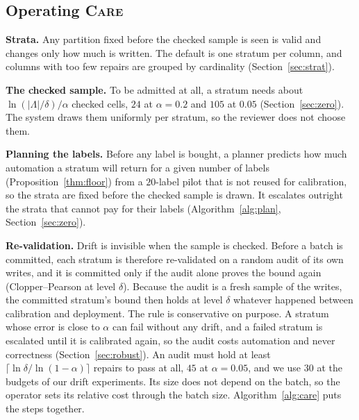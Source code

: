 \documentclass[sigconf, nonacm, balance=false]{acmart}
\theoremstyle{remark}
\begin{document}
\subsection{Operating \textsc{Care}}
\label{sec:operate}
\textbf{Strata.} Any partition fixed before the checked sample is seen is valid and
changes only how much is written. The default is one stratum per column, and columns
with too few repairs are grouped by cardinality (Section~\ref{sec:strat}).

\textbf{The checked sample.} To be admitted at all, a stratum needs about
$\ln(|\Lambda|/\delta)/\alpha$ checked cells, $24$ at $\alpha=0.2$ and $105$ at $0.05$
(Section~\ref{sec:zero}). The system draws them uniformly per stratum, so the reviewer
does not choose them.

\textbf{Planning the labels.} Before any label is bought, a planner predicts how much
automation a stratum will return for a given number of labels
(Proposition~\ref{thm:floor}) from a $20$-label pilot that is not reused for
calibration, so the strata are fixed before the checked sample is drawn. It escalates outright the
strata that cannot pay for their labels (Algorithm~\ref{alg:plan},
Section~\ref{sec:zero}).

\textbf{Re-validation.} Drift is invisible when the sample is checked. Before a batch
is committed, each stratum is therefore re-validated on a random audit of its own
writes, and it is committed only if the audit alone proves the bound again
(Clopper--Pearson at level $\delta$). Because the audit is a fresh sample of the
writes, the committed stratum's bound then holds at level $\delta$ whatever happened
between calibration and deployment. The rule is conservative on purpose. A stratum
whose error is close to $\alpha$ can fail without any drift, and a failed stratum is
escalated until it is calibrated again, so the audit costs automation and never
correctness (Section~\ref{sec:robust}). An audit must hold at least
$\lceil\ln\delta/\ln(1-\alpha)\rceil$ repairs to pass at all, $45$ at $\alpha=0.05$,
and we use $30$ at the budgets of our drift experiments. Its size does not depend on
the batch, so the operator sets its relative cost through the batch size.
Algorithm~\ref{alg:care} puts the steps together.
\end{document}
